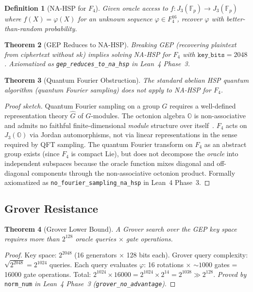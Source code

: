 \documentclass[11pt,letterpaper]{article}
\newtheorem{theorem}{Theorem}[section]
\newtheorem{definition}[theorem]{Definition}
\theoremstyle{definition}
\begin{document}
\begin{definition}[NA-HSP for $F_4$]
Given oracle access to $f: J_3(\mathbb{F}_p) \to J_3(\mathbb{F}_p)$ where
$f(X) = \varphi(X)$ for an unknown sequence $\varphi \in F_4^{16}$, recover
$\varphi$ with better-than-random probability.
\end{definition}

\begin{theorem}[GEP Reduces to NA-HSP]\label{thm:reduction}
Breaking GEP (recovering plaintext from ciphertext without $sk$) implies solving
NA-HSP for $F_4$ with $\mathtt{key\_bits} = 2048$.
Axiomatized as \texttt{gep\_reduces\_to\_na\_hsp} in Lean~4 Phase~3.
\end{theorem}

\begin{theorem}[Quantum Fourier Obstruction]\label{thm:qft}
The standard abelian HSP quantum algorithm (quantum Fourier sampling) does not
apply to NA-HSP for $F_4$.
\end{theorem}
\begin{proof}[Proof sketch]
Quantum Fourier sampling on a group $G$ requires a well-defined representation
theory $\hat{G}$ of $G$-modules.  The octonion algebra $\mathbb{O}$ is
non-associative and admits no faithful finite-dimensional \emph{module} structure
over itself~\cite{conway_smith2003}.  $F_4$ acts on $J_3(\mathbb{O})$ via
Jordan automorphisms, not via linear representations in the sense required by
QFT sampling.  The quantum Fourier transform on $F_4$ as an abstract group exists
(since $F_4$ is compact Lie), but does not decompose the \emph{oracle} into
independent subspaces because the oracle function mixes diagonal and off-diagonal
components through the non-associative octonion product.  Formally axiomatized as
\texttt{no\_fourier\_sampling\_na\_hsp} in Lean~4 Phase~3.
\end{proof}

\subsection{Grover Resistance}

\begin{theorem}[Grover Lower Bound]\label{thm:grover}
A Grover search over the GEP key space requires more than $2^{128}$ oracle
queries $\times$ gate operations.
\end{theorem}
\begin{proof}
Key space: $2^{2048}$ (16 generators $\times$ 128 bits each).
Grover query complexity: $\sqrt{2^{2048}} = 2^{1024}$ queries.
Each query evaluates $\varphi$: 16 rotations $\times$ ${\sim}1000$ gates
= 16000 gate operations.
Total: $2^{1024} \times 16000 = 2^{1024} \times 2^{14} = 2^{1038} \gg 2^{128}$.
\textit{Proved by} \texttt{norm\_num} \textit{in Lean~4 Phase~3
(\texttt{grover\_no\_advantage})}.
\end{proof}
\end{document}
